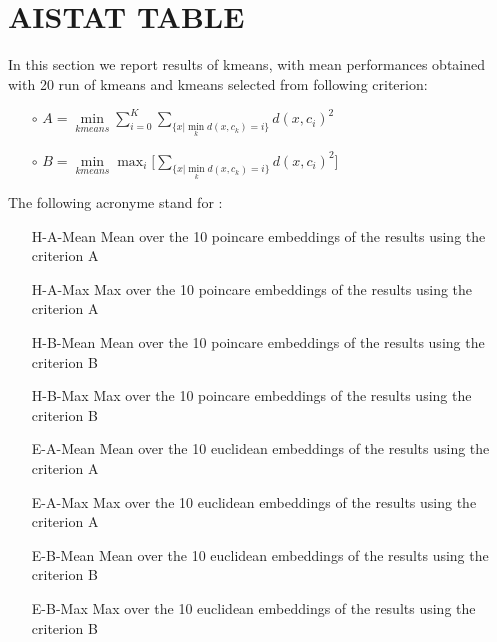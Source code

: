 \documentclass{article}
\begin{document}
\section{AISTAT TABLE}
In this section we report results of kmeans, with mean performances obtained with 20 run of kmeans and kmeans selected from following criterion:

\begin{itemize}
    \item[$\circ$]  $ A = \min\limits_{kmeans} \sum\limits_{i=0}^K \sum\limits_{\{x | \min\limits_k d(x,c_k) = i\}} d(x, c_i)^2$
    \item[$\circ$]  $ B = \min\limits_{kmeans} \max_{i} \Big[ \sum\limits_{\{x | \min\limits_k d(x,c_k) = i\}} d(x, c_i)^2 \Big]$
\end{itemize}

The following acronyme stand for :
\begin{itemize}
    \item[H-A-Mean] Mean over the 10 poincare embeddings of the results using the criterion A
    \item[H-A-Max] Max over the 10  poincare  embeddings of the results using the criterion A
    \item[H-B-Mean] Mean over the 10  poincare  embeddings of the results using the criterion B
    \item[H-B-Max] Max over the 10  poincare  embeddings of the results using the criterion B
    \item[E-A-Mean] Mean over the 10 euclidean embeddings of the results using the criterion A
    \item[E-A-Max] Max over the 10  euclidean  embeddings of the results using the criterion A
    \item[E-B-Mean] Mean over the 10  euclidean  embeddings of the results using the criterion B
    \item[E-B-Max] Max over the 10  euclidean  embeddings of the results using the criterion B 
\end{itemize}
\end{document}
